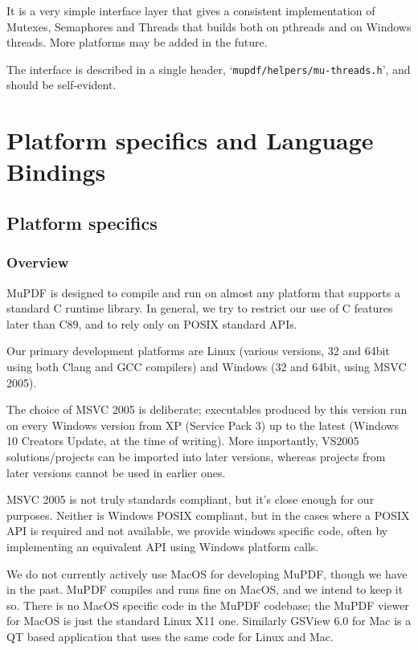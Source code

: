 \documentclass[oneside]{book}
\begin{document}
It is a very simple interface layer that gives a consistent implementation of Mutexes, Semaphores and Threads that builds both on pthreads and on Windows threads. More platforms may be added in the future.

The interface is described in a single header, `\texttt{mupdf\slash helpers\slash mu-threads.h}', and should be self-evident.

\part{Platform specifics and Language Bindings}

\chapter{Platform specifics}
\label{PlatformSpecifics}

\section{Overview}

MuPDF is designed to compile and run on almost any platform that supports a standard C runtime library. In general, we try to restrict our use of C features later than C89, and to rely only on POSIX standard APIs.

Our primary development platforms are Linux (various versions, 32 and 64bit using both Clang and GCC compilers) and Windows (32 and 64bit, using MSVC 2005).

The choice of MSVC 2005 is deliberate; executables produced by this version run on every Windows version from XP (Service Pack 3) up to the latest (Windows 10 Creators Update, at the time of writing). More importantly, VS2005 solutions/projects can be imported into later versions, whereas projects from later versions cannot be used in earlier ones.

MSVC 2005 is not truly standards compliant, but it's close enough for our purposes. Neither is Windows POSIX compliant, but in the cases where a POSIX API is required and not available, we provide windows specific code, often by implementing an equivalent API using Windows platform calls.

We do not currently actively use MacOS for developing MuPDF, though we have in the past. MuPDF compiles and runs fine on MacOS, and we intend to keep it so. There is no MacOS specific code in the MuPDF codebase; the MuPDF viewer for MacOS is just the standard Linux X11 one. Similarly GSView 6.0 for Mac is a QT based application that uses the same code for Linux and Mac.
\end{document}
